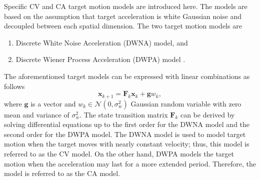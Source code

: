 \documentclass[english, 12pt, a4paper, elec, utf8, a-1b, online]{aaltothesis}
\numberwithin{equation}{section}
\renewcommand{\vec}[1]{\mathbf{#1}}
\newcommand{\normal}[2]{\mathcal{N}\left(#1, #2 \right)}
\begin{document}
Specific CV and CA target motion models are introduced here.
The models are based on the assumption that target acceleration is white Gaussian noise and decoupled between each spatial dimension.
The two target motion models are
\begin{enumerate}
    \item Discrete White Noise Acceleration (DWNA) model, and
    \item Discrete Wiener Process Acceleration (DWPA) model \cite{BarShalom2001}.
\end{enumerate}
The aforementioned target models can be expressed with linear combinations as follows
\begin{equation}
    \vec{x}_{k+1} = \mathbf{F}_k \vec{x}_k + \vec{g} w_k,
\end{equation}
where $\vec{g}$ is a vector and $w_k \in \normal{0}{\sigma_w^2}$ Gaussian random variable with zero mean and variance of $\sigma_w^2$.
The state transition matrix $\mathbf{F}_k$ can be derived by solving differential equations up to the first order for the DWNA model and the second order for the DWPA model.
The DWNA model is used to model target motion when the target moves with nearly constant velocity; thus, this model is referred to as the CV model.
On the other hand, DWPA models the target motion when the acceleration may last for a more extended period. 
Therefore, the model is referred to as the CA model.
\end{document}
